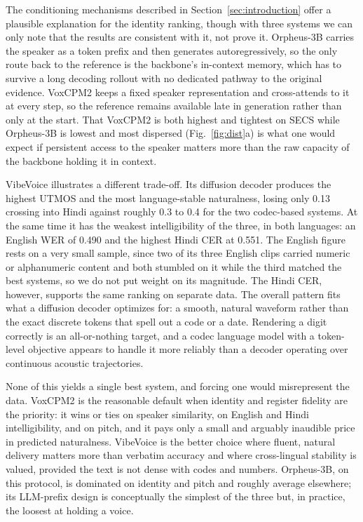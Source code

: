 \documentclass[conference]{IEEEtran}
\begin{document}
The conditioning mechanisms described in Section~\ref{sec:introduction} offer
a plausible explanation for the identity ranking, though with three systems
we can only note that the results are consistent with it, not prove it.
Orpheus-3B carries the speaker as a token prefix and then generates
autoregressively, so the only route back to the reference is the backbone's
in-context memory, which has to survive a long decoding rollout with no
dedicated pathway to the original evidence. VoxCPM2 keeps a fixed speaker
representation and cross-attends to it at every step, so the reference
remains available late in generation rather than only at the start. That
VoxCPM2 is both highest and tightest on SECS while Orpheus-3B is lowest and
most dispersed (Fig.~\ref{fig:dist}a) is what one would expect if persistent
access to the speaker matters more than the raw capacity of the backbone
holding it in context.

VibeVoice illustrates a different trade-off. Its diffusion decoder produces
the highest UTMOS and the most language-stable naturalness, losing only 0.13
crossing into Hindi against roughly 0.3 to 0.4 for the two codec-based
systems. At the same time it has the weakest intelligibility of the three, in
both languages: an English WER of 0.490 and the highest Hindi CER at 0.551.
The English figure rests on a very small sample, since two of its three
English clips carried numeric or alphanumeric content and both stumbled on it
while the third matched the best systems, so we do not put weight on its
magnitude. The Hindi CER, however, supports the same ranking on separate
data. The overall pattern fits what a diffusion decoder optimizes for: a
smooth, natural waveform rather than the exact discrete tokens that spell out
a code or a date. Rendering a digit correctly is an all-or-nothing target,
and a codec language model with a token-level objective appears to handle it
more reliably than a decoder operating over continuous acoustic trajectories.

None of this yields a single best system, and forcing one would misrepresent
the data. VoxCPM2 is the reasonable default when identity and register
fidelity are the priority: it wins or ties on speaker similarity, on English
and Hindi intelligibility, and on pitch, and it pays only a small and
arguably inaudible price in predicted naturalness. VibeVoice is the better
choice where fluent, natural delivery matters more than verbatim accuracy and
where cross-lingual stability is valued, provided the text is not dense with
codes and numbers. Orpheus-3B, on this protocol, is dominated on identity and
pitch and roughly average elsewhere; its LLM-prefix design is conceptually
the simplest of the three but, in practice, the loosest at holding a voice.
\end{document}
